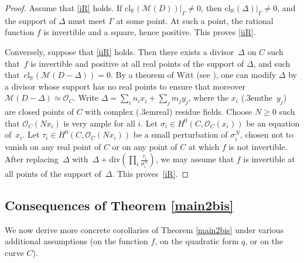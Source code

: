 \documentclass{amsart}
\theoremstyle{definition}
\theoremstyle{remark}
\numberwithin{equation}{section}
\newcommand{\cl}{\mathrm{cl}}
\newcommand{\ddiv}{\mathrm{div}}
\def\resp {\text{resp.}\kern.3em}
\def\R{\mathbb R}
\def\cM{\mathcal{M}}
\def\cO{\mathcal{O}}
\def\cM{\mathcal{M}}
\begin{document}
 \begin{proof}
 Assume that \ref{iR} holds. If $\cl_{\R}(\cM(D))|_{\Gamma}\neq 0$, then $\cl_{\R}(\Delta)|_{\Gamma}\neq 0$, and the support of $\Delta$ must meet $\Gamma$ at some point. At such a point, the rational function $f$ is invertible and a square, hence positive. This proves \ref{iiR}.

 Conversely, suppose that \ref{iiR} holds. Then there exists a divisor~$\Delta$ on $C$ such that~$f$ is invertible and positive at all real points of the support of $\Delta$, and such that~${\cl_{\R}(\cM(D-\Delta))=0}$. By a theorem of Witt (see \cite[III~p.\,4]{Witt}), one can modify $\Delta$ by a divisor whose support has no real points to ensure that moreover~$\cM(D-\Delta)\simeq\cO_{C}$. Write $\Delta=\sum_i n_ix_i+\sum_jm_jy_j$, where the $x_i$ (\resp the~$y_j$) are closed points of $C$ with complex (\resp real) residue fields. Choose $N\geq 0$ such that $\cO_C(Nx_i)$ is very ample for all $i$. Let $\sigma_i\in H^0(C,\cO_C(x_i))$ be an equation of~$x_i$. Let $\tau_i\in H^0(C,\cO_C(Nx_i))$ be a small perturbation of $\sigma_i^N$, chosen not to vanish on any real point of $C$ or on any point of $C$ at which $f$ is not invertible. After replacing~$\Delta$ with~$\Delta+\ddiv(\prod_i\frac{\tau_i}{\sigma_i^N})$, we may assume that $f$ is invertible at all points of the support of~$\Delta$. This proves~\ref{iR}.
 \end{proof}
 
 
 \subsection{Consequences of Theorem \ref{main2bis}}
 \label{parcoro}
 
 We now derive more concrete corollaries of Theorem \ref{main2bis} under various additional assumptions (on the function $f$, on the quadratic form $q$, or on the curve $C$).
\end{document}
